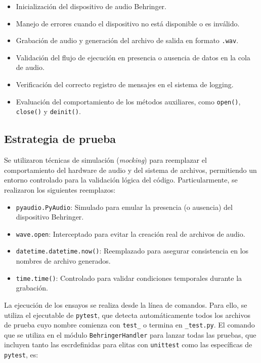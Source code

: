 \begin{itemize} \item Inicialización del dispositivo de audio Behringer. \item Manejo de errores cuando el dispositivo no está disponible o es inválido. \item Grabación de audio y generación del archivo de salida en formato \texttt{.wav}. \item Validación del flujo de ejecución en presencia o ausencia de datos en la cola de audio. \item Verificación del correcto registro de mensajes en el sistema de logging. \item Evaluación del comportamiento de los métodos auxiliares, como \texttt{open()}, \texttt{close()} y \texttt{deinit()}. \end{itemize}

\subsection{Estrategia de prueba}

Se utilizaron técnicas de simulación (\textit{mocking}) para reemplazar el comportamiento del hardware de audio y del sistema de archivos, permitiendo un entorno controlado para la validación lógica del código. Particularmente, se realizaron los siguientes reemplazos:

\begin{itemize} \item \texttt{pyaudio.PyAudio}: Simulado para emular la presencia (o ausencia) del dispositivo Behringer. \item \texttt{wave.open}: Interceptado para evitar la creación real de archivos de audio. \item \texttt{datetime.datetime.now()}: Reemplazado para asegurar consistencia en los nombres de archivo generados. \item \texttt{time.time()}: Controlado para validar condiciones temporales durante la grabación. \end{itemize}

La ejecución de los ensayos se realiza desde la línea de comandos. Para ello, se utiliza el ejecutable de \texttt{pytest}, que detecta automáticamente todos los archivos de prueba cuyo nombre comienza con \texttt{test\_} o termina en \texttt{\_test.py}. El comando que se utiliza en el módulo \texttt{BehringerHandler} para lanzar todas las pruebas, que incluyen tanto las escrdefinidas para elitas con \texttt{unittest} como las específicas de \texttt{pytest}, es:

